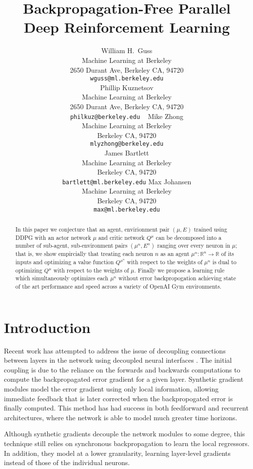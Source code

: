 \documentclass{article} %
\title{Backpropagation-Free Parallel Deep Reinforcement Learning}
\author{
William H.~Guss \\
Machine Learning at Berkeley\\
2650 Durant Ave, Berkeley CA, 94720 \\
\texttt{wguss@ml.berkeley.edu} \\
Phillip Kuznetsov \\
Machine Learning at Berkeley\\
2650 Durant Ave, Berkeley CA, 94720 \\
\texttt{philkuz@berkeley.edu} \
\And
Mike Zhong \\
Machine Learning at Berkeley \\
Berkeley CA, 94720 \\
\texttt{mlyzhong@berkeley.edu} \\
\And
James Bartlett\\
Machine Learning at Berkeley \\
Berkeley CA, 94720 \\
\texttt{bartlett@ml.berkeley.edu}
\And
Max Johansen \\
Machine Learning at Berkeley \\
Berkeley CA, 94720 \\
\texttt{max@ml.berkeley.edu}
}
\numberwithin{equation}{subsection}
\numberwithin{theorem}{subsection}
\theoremstyle{named}
\begin{document}
\maketitle

\begin{abstract}
    In this paper we conjecture that an agent, envirionment pair $(\mu, E)$ trained using DDPG with an actor network $\mu$ and critic network $Q^{\mu}$ can be decomposed into a number of sub-agent, sub-environment pairs  $(\mu^n, E^n)$ ranging over every neuron in $\mu$; that is, we show empircially that treating each neuron $n$ as an agent $\mu^n: \mathbb{R}^n \to \mathbb{R}$ of its inputs and optimizing a value function $Q^{\mu^n}$ with respect to the weights of $\mu^n$ is dual to optimizing $Q^\mu$ with respect to the weights of $\mu$. Finally we propose a learning rule which simultaneously optimizes each $\mu^n$ without error backpropogation achieving state of the art performance and speed across a variety of OpenAI Gym environments.
\end{abstract}
\listoftodos


\section{Introduction}


Recent work has attempted to address the issue of decoupling connections between layers in the network using decoupled neural interfaces \cite{jaderberg2016syngrad}. The initial coupling is due to the reliance on the forwards and backwards computations to compute the backpropagated error gradient for a given layer. Synthetic gradient modules model the error gradient using only local information, allowing immediate feedback that is later corrected when the backpropogated error is finally computed. This method has had success in both feedforward and recurrent architectures, where the network is able to model much greater time horizons.

Although synthetic gradients decouple the network modules to some degree, this technique still relies on synchronous backpropagation to learn the local regressors. In addition, they model at a lower granularity, learning layer-level gradients instead of those of the individual neurons.
\end{document}
